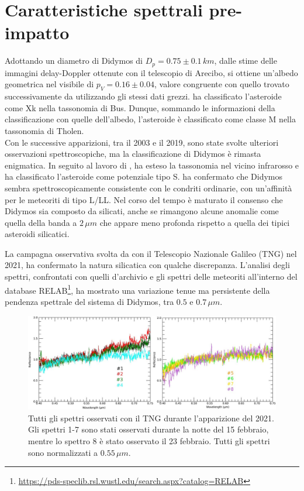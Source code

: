 \documentclass[a4paper,11pt,openright]{book}
\begin{document}
\section{Caratteristiche spettrali pre-impatto}
Adottando un diametro di Didymos di $D_p=0.75 \pm 0.1\, km$, dalle stime delle immagini delay-Doppler ottenute con il telescopio di Arecibo, si ottiene un'albedo geometrica nel visibile di $p_V=0.16 \pm 0.04$, valore congruente con quello trovato successivamente da \citet{naidu_radar_2020} utilizzando gli stessi dati grezzi. \citet{binzel_observed_2004} ha classificato l'asteroide come Xk nella tassonomia di Bus. Dunque, sommando le informazioni della classificazione con quelle dell'albedo, l'asteroide è classificato come classe M nella tassonomia di Tholen.\\
Con le successive apparizioni, tra il 2003 e il 2019, sono state svolte ulteriori osservazioni spettroscopiche, ma la classificazione di Didymos è rimasta enigmatica. In seguito al lavoro di \citet{binzel_observed_2004}, \citet{de_leon_spectral_2006, de_leon_observations_2010} ha esteso la tassonomia nel vicino infrarosso e ha classificato l'asteroide come potenziale tipo S. \citet{dunn_mineralogies_2013} ha confermato che Didymos sembra spettroscopicamente consistente con le condriti ordinarie, con un'affinità per le meteoriti di tipo L/LL. Nel corso del tempo è maturato il consenso che Didymos sia composto da silicati, anche se rimangono alcune anomalie come quella della banda a $2\,\mu m$ che appare meno profonda rispetto a quella dei tipici asteroidi silicatici. 

La campagna osservativa svolta da \citet{ieva_spectral_2022} con il Telescopio Nazionale Galileo (TNG) nel 2021, ha confermato la natura silicatica con qualche discrepanza. L'analisi degli spettri, confrontati con quelli d'archivio e gli spettri delle meteoriti all'interno del database RELAB\footnote{\href{https://pds-speclib.rsl.wustl.edu/search.aspx?catalog=RELAB}{https://pds-speclib.rsl.wustl.edu/search.aspx?catalog=RELAB}}, ha mostrato una variazione tenue ma persistente della pendenza spettrale del sistema di Didymos, tra $0.5$ e $0.7\,\mu m$. 

\begin{figure}[!h]
    \centering
    \includegraphics[scale=0.65]{figure/spettri_tot_ieva.jpg}
    \caption[Spettri osservati con il TNG durante l'apparizione del 2021.]{Tutti gli spettri osservati con il TNG durante l'apparizione del 2021. Gli spettri 1-7 sono stati osservati durante la notte del 15 febbraio, mentre lo spettro 8 è stato osservato il 23 febbraio. Tutti gli spettri sono normalizzati a $0.55\,\mu m$. \citep{ieva_spectral_2022}}
    \label{fig:spettri_tot_ieva}
\end{figure}
\end{document}
